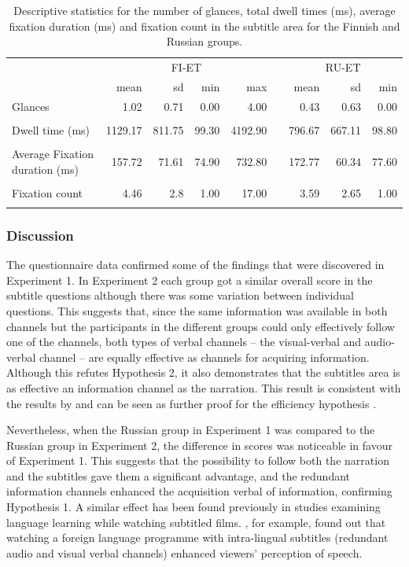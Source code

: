 \documentclass[output=paper]{langsci/langscibook}
\begin{document}
\begin{table}
\small
\begin{tabularx}{\textwidth}{Xrrrrcrrr} 
\lsptoprule
& \multicolumn{4}{c}{ FI-ET} && \multicolumn{3}{c}{ RU-ET}\\
				& mean & sd & min & max && mean & sd & min\\
\midrule
{ Glances} 			& 1.02 	  & 0.71   & 0.00 & 4.00     && 0.43   & 0.63   & 0.00\\ \\
{ Dwell time (ms)} 		& 1129.17 & 811.75 & 99.30 & 4192.90 && 796.67 & 667.11 & 98.80\\ \\
{ Average Fixation duration (ms)}	& 157.72  & 71.61  & 74.90 & 732.80  && 172.77 & 60.34  & 77.60\\ \\
{ Fixation count} 		& 4.46    & 2.8    & 1.00  & 17.00   && 3.59   & 2.65   & 1.00\\  
\lspbottomrule
\end{tabularx}
\caption{Descriptive statistics for the number of glances, total dwell times (ms), average fixation duration (ms) and fixation count in the subtitle area for the Finnish and Russian groups.}
\label{lang:tab:1}
\end{table}

\subsubsection{Discussion}

The questionnaire data confirmed some of the findings that were discovered in Experiment 1. In Experiment 2 each group got a similar overall score in the subtitle questions although there was some variation between individual questions. This suggests that, since the same information was available in both channels but the participants in the different groups could only effectively follow one of the channels, both types of verbal channels – the visual-verbal and audio-verbal channel – are equally effective as channels for acquiring information. Although this refutes Hypothesis 2, it also demonstrates that the subtitles area is as effective an information channel as the narration. This result is consistent with the results by \citet{Perego2010} and can be seen as further proof for the efficiency hypothesis \citep{dydewalle1987}. 

Nevertheless, when the Russian group in Experiment 1 was compared to the Russian group in Experiment 2, the difference in scores was noticeable in favour of Experiment 1. This suggests that the possibility to follow both the narration and the subtitles gave them a significant advantage, and the redundant information channels enhanced the acquisition verbal of information, confirming Hypothesis 1. A similar effect has been found previously in studies examining language learning while watching subtitled films. \citet{mitterer2009}, for example, found out that watching a foreign language programme with intra-lingual subtitles (redundant audio and visual verbal channels) enhanced viewers’ perception of speech. 
\end{document}
